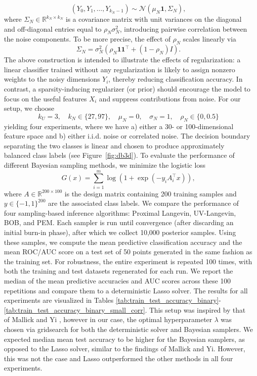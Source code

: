 \documentclass[11pt, twoside]{report}
\begin{document}
\[
(Y_0, Y_1, \dots, Y_{k_N-1}) \sim \mathcal{N}(\mu_N \mathbf{1}, \Sigma_N),
\]
where $\Sigma_N \in \mathbb{R}^{k_N \times k_N}$ is a covariance matrix with unit variances on the diagonal and off-diagonal entries equal to $\rho_N \sigma_N^2$,  introducing pairwise correlation between the noise components. To be more precise, the effect of $\rho_N$ scales linearly via
\[
\Sigma_N = \sigma_N^2 \left( \rho_N \mathbf{1} \mathbf{1}^\top + (1 - \rho_N) I \right).
\] 
The above construction is intended to illustrate the effects of regularization: a linear classifier trained without any regularization is likely to assign nonzero weights to the noisy dimensions $Y_i$, thereby reducing classification accuracy. In contrast, a sparsity-inducing regularizer (or prior) should encourage the model to focus on the useful features $X_i$ and suppress contributions from noise. For our setup, we choose
\[
k_U = 3, \quad k_N \in \{27, 97\}, \quad \mu_N = 0, \quad \sigma_N = 1, \quad \rho_N \in \{0, 0.5\}
\]
yielding four experiments, where we have a) either a 30- or 100-dimensional feature space and b) either i.i.d. noise or correlated noise. The decision boundary separating the two classes is linear and chosen to produce approximately balanced class labels (see Figure~\ref{fig:db3d}). To evaluate the performance of different Bayesian sampling methods, we minimize the logistic loss
\begin{equation} \label{eq:binary_logistic}
    G(x) = \sum_{i=1}^m \log\left(1 + \exp(-y_i A_i^\top x)\right),
\end{equation}
where $A \in \mathbb{R}^{200 \times 100}$ is the design matrix containing 200 training samples and $y \in \{-1, 1\}^{200}$ are the associated class labels. We compare the performance of four sampling-based inference algorithms: Proximal Langevin, UV-Langevin, BOB, and PEM. Each sampler is run until convergence (after discarding an initial burn-in phase), after which we collect 10,000 posterior samples. Using these samples, we compute the mean predictive classification accuracy and the mean ROC/AUC score on a test set of 50 points generated in the same fashion as the training set. For robustness, the entire experiment is repeated 100 times, with both the training and test datasets regenerated for each run. We report the median of the mean predictive accuracies and AUC scores across these 100 repetitions and compare them to a deterministic Lasso solver. The results for all experiments are visualized in Tables \ref{tab:train_test_accuracy_binary}-\ref{tab:train_test_accuracy_binary_small_corr}. This setup was inspired by that of Mallick and Yi \cite{mallick2014Bayesian}, however in our case, the optimal hyperparameter $\lambda$ was chosen via gridsearch for both the deterministic solver and Bayesian samplers. We expected median mean test accuracy to be higher for the Bayesian samplers, as opposed to the Lasso solver, similar to the findings of Mallick and Yi. However, this was not the case and Lasso outperformed the other methods in all four experiments.
\end{document}
